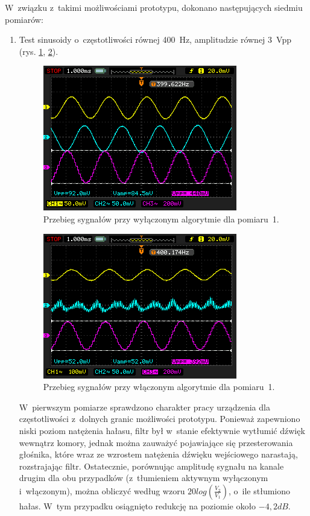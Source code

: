 W~związku z~takimi możliwościami prototypu, dokonano następujących siedmiu pomiarów:
\begin{enumerate}
	\item Test sinusoidy o~częstotliwości równej \SI{400}{\Hz}, amplitudzie równej 3~Vpp (rys. \ref{fig:test_1_off}, \ref{fig:test_1_on}).\\
	\begin{figure}[h!]
		\centering
		\includegraphics[scale=0.7]{../Assets/Results/1_400_3_off.png}
		\caption{Przebieg sygnałów przy wyłączonym algorytmie dla pomiaru~1.}
		\label{fig:test_1_off}
	\end{figure}
	\begin{figure}[h!]
		\centering
		\includegraphics[scale=0.7]{../Assets/Results/1_400_3_on.png}
		\caption{Przebieg sygnałów przy włączonym algorytmie dla pomiaru~1.}
		\label{fig:test_1_on}
	\end{figure}
	W~pierwszym pomiarze sprawdzono charakter pracy urządzenia dla częstotliwości z~dolnych granic możliwości prototypu. Ponieważ zapewniono niski poziom natężenia hałasu, filtr był w~stanie efektywnie wytłumić dźwięk wewnątrz komory, jednak można zauważyć pojawiające się przesterowania głośnika, które wraz ze wzrostem natężenia dźwięku wejściowego narastają, rozstrajając filtr. Ostatecznie, porównując amplitudę sygnału na kanale drugim dla obu przypadków (z~tłumieniem aktywnym wyłączonym i~włączonym), można obliczyć według wzoru $20log(\frac{V_2}{V_1})$, o~ile stłumiono hałas. W~tym przypadku osiągnięto redukcję na poziomie około $-4,2 dB$.

\end{enumerate}
